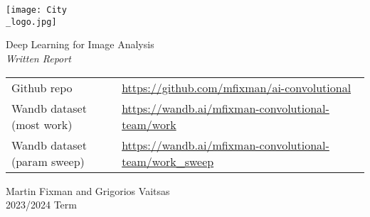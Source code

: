 \documentclass[a4paper,11pt]{article}
\begin{document}
\begin{titlepage}
	\begin{center}
		\texttt{[image: City\\\_logo.jpg]} \\[4em]
		\begin{bfseries}
			\begin{Huge}
				Deep Learning for Image Analysis \\[35pt]
				\textsl{Written Report}
			\end{Huge}
		\end{bfseries}
	\end{center}
	\vfill{}
	\begin{small}
		\begin{tabularx}{1.05\textwidth}{X l}
			Github repo & \url{https://github.com/mfixman/ai-convolutional} \\
			Wandb dataset (most work) & \url{https://wandb.ai/mfixman-convolutional-team/work} \\
			Wandb dataset (param sweep) & \url{https://wandb.ai/mfixman-convolutional-team/work_sweep}
		\end{tabularx}
	\end{small}
	\begin{LARGE}
		\begin{center}
			\begin{sffamily}
				Martin Fixman and Grigorios Vaitsas \\[10pt]
				2023/2024 Term
			\end{sffamily}
		\end{center}
	\end{LARGE}
\end{titlepage}





\clearpage{}



\clearpage{}



\clearpage{}



\clearpage{}



\clearpage{}

\begin{appendices}
	
\end{appendices}

\clearpage{}


\end{document}
